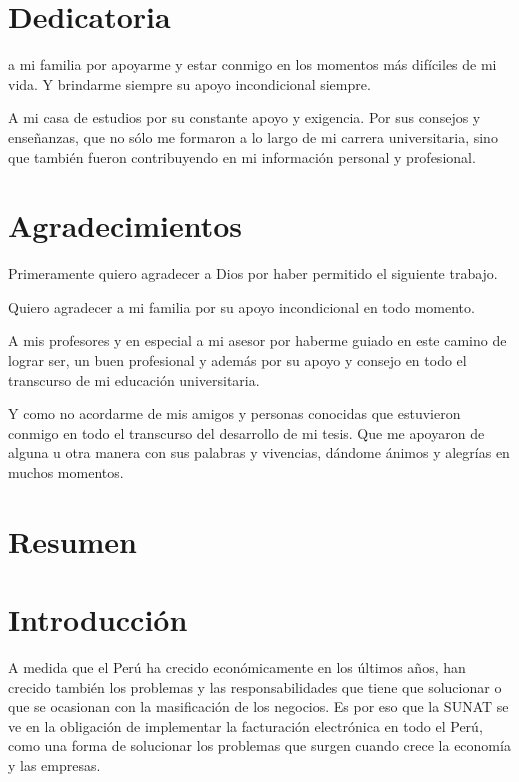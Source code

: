 \documentclass[12pt,a4paper,openany,oneside]{book}
\begin{document}
    \chapter*{Dedicatoria}
    a mi familia por apoyarme y estar conmigo en los momentos más difíciles de mi vida. Y brindarme siempre su apoyo incondicional siempre.
    
    A mi casa de estudios por su constante apoyo y exigencia. Por sus consejos y enseñanzas, que no sólo me formaron a lo largo de mi carrera universitaria, sino que también fueron contribuyendo en mi información personal y profesional.

    \chapter*{Agradecimientos}
    Primeramente quiero agradecer a Dios por haber permitido el siguiente trabajo.

    Quiero agradecer a mi familia por su apoyo incondicional en todo momento.

    A mis profesores y en especial a mi asesor por haberme guiado en este camino de lograr ser, un buen profesional y además por su apoyo y consejo en todo el transcurso de mi educación universitaria. 

    Y como no acordarme de mis amigos y personas conocidas que estuvieron conmigo en todo el transcurso del desarrollo de mi tesis. Que me apoyaron de alguna u otra manera con sus palabras y vivencias, dándome ánimos y alegrías en muchos momentos.

    \tableofcontents

    \listoftables

    \listoffigures

    \chapter*{Resumen}

    \chapter*{Introducción}
    A medida que el Perú ha crecido económicamente en los últimos años, han crecido también los problemas y las responsabilidades que tiene que solucionar o que se ocasionan con la masificación de los negocios. Es por eso que la SUNAT se ve en la obligación de implementar la facturación electrónica en todo el Perú, como una forma de solucionar los problemas que surgen cuando crece la economía y las empresas.
\end{document}
